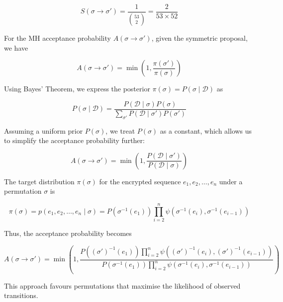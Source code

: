 \documentclass{article}
\begin{document}
\begin{enumerate}
    \begin{equation}
    S(\sigma \rightarrow \sigma') = \frac{1}{\binom{53}{2}} = \frac{2}{53 \times 52}
    \end{equation}
    
    For the MH acceptance probability \( A(\sigma \rightarrow \sigma') \), given the symmetric proposal, we have
    
    \begin{equation}
    A(\sigma \rightarrow \sigma') = \min \left( 1, \frac{\pi(\sigma')}{\pi(\sigma)} \right)
    \end{equation}
    
    Using Bayes’ Theorem, we express the posterior \( \pi(\sigma) = P(\sigma \mid \mathcal{D}) \) as
    
    \begin{equation}
    P(\sigma \mid \mathcal{D}) = \frac{P(\mathcal{D} \mid \sigma) P(\sigma)}{\sum_{\sigma'} P(\mathcal{D} \mid \sigma') P(\sigma')}
    \end{equation}
    
    Assuming a uniform prior \( P(\sigma) \), we treat \( P(\sigma) \) as a constant, which allows us to simplify the acceptance probability further:
    
    \begin{equation}
    A(\sigma \rightarrow \sigma') = \min \left( 1, \frac{P(\mathcal{D} \mid \sigma')}{P(\mathcal{D} \mid \sigma)} \right)
    \end{equation}
    
    The target distribution \( \pi(\sigma) \) for the encrypted sequence \( e_1, e_2, \ldots, e_n \) under a permutation \( \sigma \) is
    
    \begin{equation}
    \pi(\sigma) = p(e_1, e_2, \ldots, e_n \mid \sigma) = P(\sigma^{-1}(e_1)) \prod_{i=2}^{n} \psi(\sigma^{-1}(e_i), \sigma^{-1}(e_{i-1}))
    \end{equation}
    
    Thus, the acceptance probability becomes
    
    \begin{equation}
    \boxed{A(\sigma \rightarrow \sigma') = \min \left( 1, \frac{P((\sigma')^{-1}(e_1)) \prod_{i=2}^{n} \psi((\sigma')^{-1}(e_i), (\sigma')^{-1}(e_{i-1}))}{P(\sigma^{-1}(e_1)) \prod_{i=2}^{n} \psi(\sigma^{-1}(e_i), \sigma^{-1}(e_{i-1}))} \right)}
    \end{equation}
    
    This approach favours permutations that maximise the likelihood of observed transitions.






\end{enumerate}
\end{document}

